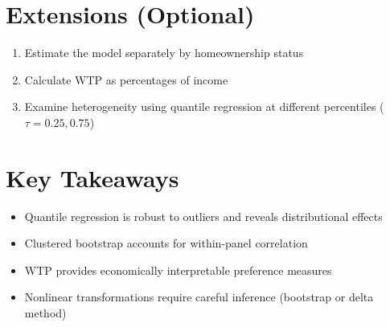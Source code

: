 \documentclass[12pt]{article}
\begin{document}
\section{Extensions (Optional)}

\begin{enumerate}
    \item Estimate the model separately by homeownership status
    \item Calculate WTP as percentages of income
    \item Examine heterogeneity using quantile regression at different percentiles ($\tau = 0.25, 0.75$)
\end{enumerate}

\section{Key Takeaways}

\begin{itemize}
    \item Quantile regression is robust to outliers and reveals distributional effects
    \item Clustered bootstrap accounts for within-panel correlation
    \item WTP provides economically interpretable preference measures
    \item Nonlinear transformations require careful inference (bootstrap or delta method)
\end{itemize}
\end{document}
